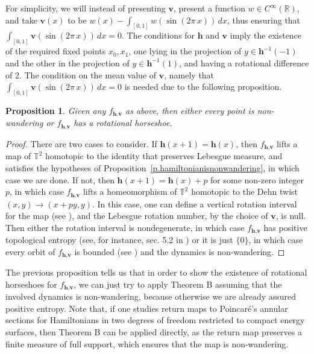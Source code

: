 \documentclass[12pt,a4paper]{amsart}
\newtheorem{prop}[thm]{Proposition}
\theoremstyle{definition}
\theoremstyle{remark}
\newcommand{\T}{\mathbb{T}}
\newcommand{\R}{\mathbb{R}}
\begin{document}
\smallskip

For simplicity, we will instead of presenting $\textbf{v}$, present a function $w \in C^{\infty}(\R)$, and take $\textbf{v}(x)$ to be $w(x)-\int_{[0,1]}w(\sin(2\pi\,x))\,dx$, thus ensuring that $\int_{[0,1]}\textbf{v}(\sin(2\pi\,x))\,dx=0$. 
The conditions for $\textbf{h}$ and $\textbf{v}$ imply the existence of the required fixed points $x_0,x_1$,
one lying in the projection of $y\in \textbf{h}^{-1}(-1)$ and the other in the projection of $y\in \textbf{h}^{-1}(1)$, and
having a rotational difference of 2. The condition on the mean value of $\textbf{v}$, namely that $\int_{[0,1]}\textbf{v}(\sin(2\pi\,x))\,dx=0$ is needed
due to the following proposition.
\begin{prop}
Given any $f_{\textbf{h},\textbf{v}}$ as above, then either every point is non-wandering or $f_{\textbf{h},\textbf{v}}$ has a  rotational horseshoe.
\end{prop}
\begin{proof}
There are two cases to consider. If  $\textbf{h}(x+1)=\textbf{h}(x)$, then  $f_{\textbf{h},\textbf{v}}$ lifts a map of $\T^2$ homotopic to the identity that preserves Lebesgue measure, and satisfies the hypotheses of Proposition~\ref{p.hamiltonianisnonwandering}, in which case we are done. If not, then $\textbf{h}(x+1)=\textbf{h}(x)+p$ for some non-zero integer $p$, in which case $f_{\textbf{h},\textbf{v}}$ lifts a homeomorphism of $\T^2$ homotopic to the Dehn twist $(x,y)\to(x+py, y)$. In this case, one can define a vertical rotation interval for the map (see \cite{doeff1997rotation,addas2002existence}), and the Lebesgue rotation number, by the choice of $\textbf{v}$, is null. Then either the rotation interval is nondegenerate, in which case $f_{\textbf{h},\textbf{v}}$ has positive topological entropy (see, for instance,  sec. 5.2 in \cite{nunes2022transitivity}) or it is just $\{0\}$, in which case every orbit of $f_{\textbf{h},\textbf{v}}$ is bounded (see \cite{addas2012dynamics}) and the dynamics is non-wandering.  
\end{proof}

The previous proposition tells us that in order to show the existence of rotational horseshoes for $f_{\textbf{h},\textbf{v}}$, we can just try to apply Theorem B assuming that the involved dynamics is non-wandering, because otherwise we are already assured positive entropy. Note that, if one studies return maps to Poincar\'e's annular sections for Hamiltonians in two degrees of freedom restricted to compact energy surfaces, then Theorem B can be applied directly, as the return map preserves a finite measure of full support, which ensures that the map is non-wandering. 
\end{document}
